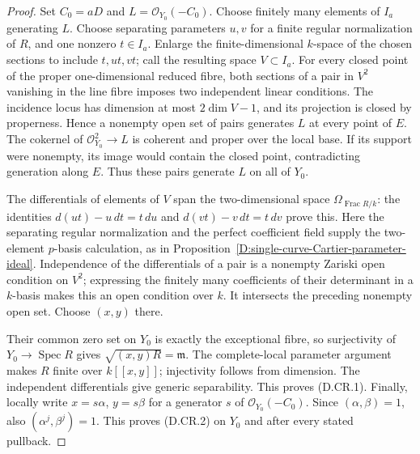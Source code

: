 \begin{proof}
Set $C_0=aD$ and $L=\mathcal O_{Y_0}(-C_0)$.
Choose finitely many elements of $I_a$ generating $L$.
Choose separating parameters $u,v$ for a finite regular
normalization of $R$, and one nonzero $t\in I_a$. Enlarge the
finite-dimensional $k$-space of the chosen sections to include
$t,ut,vt$; call the resulting space $V\subset I_a$.
For every closed point of the proper one-dimensional reduced
fibre, both sections of a pair in $V^2$ vanishing in the line
fibre imposes two independent linear conditions. The incidence
locus has dimension at most $2\dim V-1$, and its projection is
closed by properness. Hence a nonempty open set of pairs
generates $L$ at every point of $E$. The cokernel of
$\mathcal O_{Y_0}^2\to L$ is coherent and proper over the
local base. If its support were nonempty, its image would
contain the closed point, contradicting generation along $E$.
Thus these pairs generate $L$ on all of $Y_0$.

The differentials of elements of $V$ span the two-dimensional
space $\Omega_{\operatorname{Frac}R/k}$: the identities
$d(ut)-u\,dt=t\,du$ and $d(vt)-v\,dt=t\,dv$ prove this.
Here the separating regular normalization and the perfect
coefficient field supply the two-element $p$-basis calculation,
as in Proposition~\ref{D:single-curve-Cartier-parameter-ideal}.
Independence of the differentials of a pair is a nonempty
Zariski open condition on $V^2$; expressing the finitely many
coefficients of their determinant in a $k$-basis makes this
an open condition over $k$. It intersects the preceding
nonempty open set. Choose $(x,y)$ there.

Their common zero set on $Y_0$ is exactly the exceptional
fibre, so surjectivity of $Y_0\to\operatorname{Spec}R$ gives
$\sqrt{(x,y)R}=\mathfrak m$. The complete-local parameter
argument makes $R$ finite over $k[[x,y]]$; injectivity follows
from dimension. The independent differentials give generic
separability. This proves (D.CR.1). Finally, locally write
$x=s\alpha$, $y=s\beta$ for a generator $s$ of
$\mathcal O_{Y_0}(-C_0)$. Since $(\alpha,\beta)=1$, also
$(\alpha^j,\beta^j)=1$. This proves (D.CR.2) on $Y_0$ and
after every stated pullback.
\end{proof}


